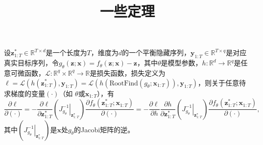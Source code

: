 \documentclass[cn,hazy,cyan,11pt,normal]{elegantnote}
\title{一些定理}
\date{}
\begin{document}
\maketitle

    \begin{theorem}[平衡模型的梯度]
        设$\mathbf{z}_{1:T}^{*}\in\mathbb{R}^{T\times d}$是一个长度为$T$，维度为$d$的一个平衡隐藏序列，$\mathbf{y}_{1:T}\in\mathbb{R}^{T\times q}$是对应真实目标序列，令$g_{\theta}(\mathbf{z};\mathbf{x})=f_{\theta}(\mathbf{z};\mathbf{x})-\mathbf{z}$，其中$\theta$是模型参数，$h:\mathbb{R}^d\rightarrow\mathbb{R}^q$是任意可微函数，$\mathcal{L}:\mathbb{R}^q\times\mathbb{R}^q\rightarrow\mathbb{R}$是损失函数，损失定义为$\ell=\mathcal{L}(h(\mathbf{z}_{1:T}^{*}),\mathbf{y}_{1:T})=\mathcal{L}(h(\text{RootFind}(g_{\theta};\mathbf{x}_{1:T})),\mathbf{y}_{1:T})$，则关于任意待求梯度的变量$(\cdot)$（如 $\theta$或$\mathbf{x}_{1:T}$），有\[\dfrac{\partial\ell}{\partial(\cdot)}=-\dfrac{\partial\ell}{\partial\mathbf{z}_{1:T}^{*}}\left(\left. J_{g_{\theta}}^{-1}\right|_{\mathbf{z}_{1:T}^{*}} \right)\dfrac{\partial f_{\theta}(\mathbf{z}_{1:T}^{*};\mathbf{x}_{1:T})}{\partial(\cdot)}=-\dfrac{\partial\ell}{\partial h}\dfrac{\partial h}{\partial\mathbf{z}_{1:T}^{*}}\left(\left. J_{g_{\theta}}^{-1}\right|_{\mathbf{z}_{1:T}^{*}} \right)\dfrac{\partial f_{\theta}(\mathbf{z}_{1:T}^{*};\mathbf{x}_{1:T})}{\partial(\cdot)},\]其中$\left(\left. J_{g_{\theta}}^{-1}\right|_{\mathbf{z}_{1:T}^{*}} \right)$是$\mathbf{x}$处$g_{\theta}$的Jacobi矩阵的逆。
    \end{theorem}
\end{document}
